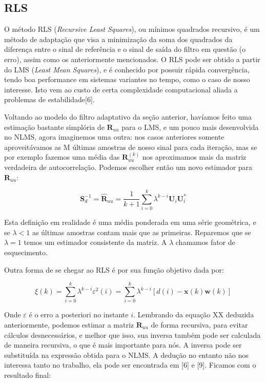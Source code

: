 \documentclass[a4paper, 12pt]{book}
\begin{document}
\subsection{RLS}

\indent O método RLS (\textit{Recursive Least Squares}), ou mínimos quadrados recursivo, é um método de adaptação que visa a minimização da soma dos quadrados da diferença entre o sinal de referência e o sinal de saída do filtro em questão (o erro), assim como os anteriormente mencionados. O RLS pode ser obtido a partir do LMS (\textit{Least Mean Squares}), e é conhecido por possuir rápida convergência, tendo boa performance em sistemas variantes no tempo, como o caso de nosso interesse. Isto vem ao custo de certa complexidade computacional aliada a problemas de estabilidade[6].

\indent Voltando ao modelo do filtro adaptativo da seção anterior, havíamos feito uma estimação bastante simplória de $\boldsymbol{R}_{uu}$ para o LMS, e um pouco mais desenvolvida no NLMS, agora imaginemos uma outra: nos casos anteriores somente aproveitávamos as M últimas amostras de nosso sinal para cada iteração, mas se por exemplo fazemos uma média das $\boldsymbol{R}_{uu}^{(k)}$ nos aproximamos mais da matriz verdadeira de autocorrelação. Podemos escolher então um novo estimador para $\boldsymbol{R}_{uu}$:

\begin{equation}
\boldsymbol{S}_{d}^{-1}=\boldsymbol{\hat{R}}_{uu}=\frac{1}{k+1}\sum_{i=0}^{k}\lambda^{k-i}\boldsymbol{U}_i\boldsymbol{U}_i^*
\end{equation}

\indent Esta definição em realidade é uma média ponderada em uma série geométrica, e se $\lambda<1$ as últimas amostras contam mais que as primeiras. Reparemos que se $\lambda=1$ temos um estimador consistente da matriz. A $\lambda$ chamamos fator de esquecimento.


\indent Outra forma de se chegar ao RLS é por sua função objetivo dada por:

\begin{equation}
\xi(k)=\sum_{i=0}^{k}\lambda^{k-i}\varepsilon^2(i)
=\sum_{i=0}^{k}\lambda^{k-i}[d(i)-\boldsymbol{x}(k) \boldsymbol{w}(k)]
\end{equation}

\indent Onde $\varepsilon$ é o erro a posteriori no instante $i$. Lembrando da equação XX deduzida anteriormente, podemos estimar a matriz $\boldsymbol{R}_{uu}$ de forma recursiva, para evitar cálculos desnecessários, e melhor que isso, sua inversa também pode ser calculada de maneira recursiva, o que é mais importante para nós. A inversa pode ser substituída na expressão obtida para o NLMS. A dedução no entanto não nos interessa tanto no trabalho, ela pode ser encontrada em [6] e [9]. Ficamos com o resultado final:
\end{document}
